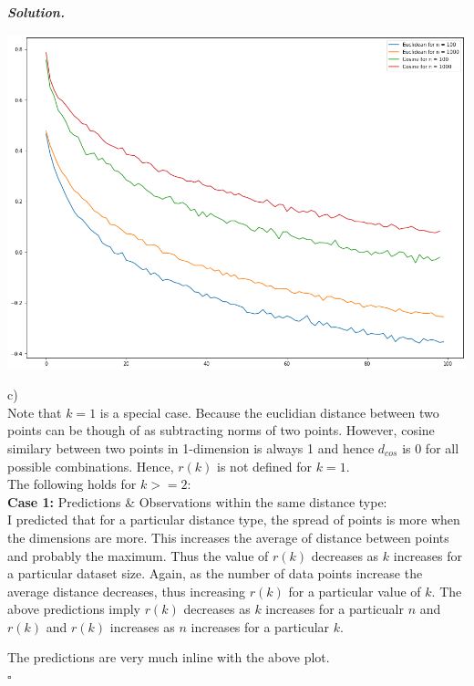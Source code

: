 \documentclass[12pt]{article}
\newenvironment{solution}[1][\it{Solution}]{\textbf{#1. } }{$\square$}
\begin{document}
\begin{solution}
\begin{center}
\includegraphics[width=18cm, keepaspectratio]{CurseOfDimensionality}
\end{center}

c)\\

Note that $k=1$ is a special case. Because the euclidian distance between two points can be though of as subtracting norms of two points. However, cosine similary between two points in 1-dimension is always 1 and hence $d_{cos}$ is $0$ for all possible combinations. Hence, $r(k)$ is not defined for $k = 1$.\\

The following holds for $k >= 2$:\\

\textbf{Case 1:} Predictions \& Observations within the same distance type:\\
I predicted that for a particular distance type, the spread of points is more when the dimensions are more. This increases the average of distance between points and probably the maximum.  Thus the value of $r(k)$ decreases as $k$ increases for a particular dataset size.
Again, as the number of data points increase the average distance decreases, thus increasing $r(k)$ for a particular value of $k$.
The above predictions imply $r(k)$ decreases as $k$ increases for a particualr $n$ and $r(k)$ and $r(k)$ increases as $n$ increases for a particular $k$.

The predictions are very much inline with the above plot.\\


\end{solution}
\end{document}
